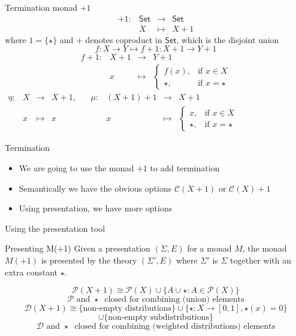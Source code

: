 \documentclass{beamer}
\newcommand{\cat}[1]{\mathsf{#1}}
\newcommand{\C}{\mathcal C}
\begin{document}
\begin{frame}{Termination monad $+1$}
    $$\begin{array}{cccl}
 +1 \colon & \cat{Set} &\longrightarrow& \cat{Set} \\
    &X &\longmapsto&   X + 1
\end{array}$$
    \pause
    where $1 = \{\star\}$ and $+$ denotes coproduct in $\cat{Set}$, which is the disjoint union
    \pause
    $$f \colon X \to Y \longmapsto f+1 \colon X+1 \to Y+1$$ $$\begin{array}{cccl}
 f+1 \colon & X+1 &\longrightarrow& Y+1 \\
    & x &   \longmapsto &  \left\{ \begin{array}{ll}
    f(x) , & \text{if } x \in X\\
    \star , & \text{if } x = \star
\end{array} \right.
\end{array}$$
    \pause
    $\begin{array}{ccclcccl}
\eta \colon & X &\longrightarrow& X+1, ~~~~ &\mu \colon& (X+1)+1 &\longrightarrow& X+1 \\
            &x & \longmapsto &  x ~~~~ & &x   &\longmapsto&   \left\{ \begin{array}{ll}
     x, & \text{if } x \in X\\
    \star , & \text{if } x = \star 
\end{array} \right.
    \end{array}$
\end{frame}


\begin{frame}{Termination}
    \begin{itemize}
        \item We are going to use the monad $+1$ to add termination
    \pause 
    \item Semantically we have the obvious options $\C(X+1)$ or $\C(X) + 1$
    \pause
    \item Using presentation, we have more options
    \end{itemize}
    
\end{frame}

\begin{frame}{Using the presentation tool}

    \pause
    
    \begin{block}{Presenting M(+1)}
        Given a presentation $(\Sigma, E)$ for a monad $M$, the monad $M(+1)$ is presented by the theory $(\Sigma', E)$ where $\Sigma'$ is $\Sigma$ together with an extra constant $\star$.
    \end{block}
    \pause
    $$\mathcal{P}(X+1) \cong \mathcal{P}(X) \cup \{A \cup {\star} : A \in \mathcal{P}(X)\}$$
    $$\mathcal{P} \text{ and } \star~ \text{  closed for combining (union) elements}$$
    \pause
    $$\mathcal{D}(X+1) \cong \{\text{non-empty distributions}\} \cup \{\star\colon X \to [0,1], \star(x)=0\}$$
    $$\cup \{\text{non-empty subdistributions}\}$$
    $$\mathcal{D} \text{ and } \star ~\text{  closed for combining (weighted distributions) elements}$$
    
\end{frame}
\end{document}
